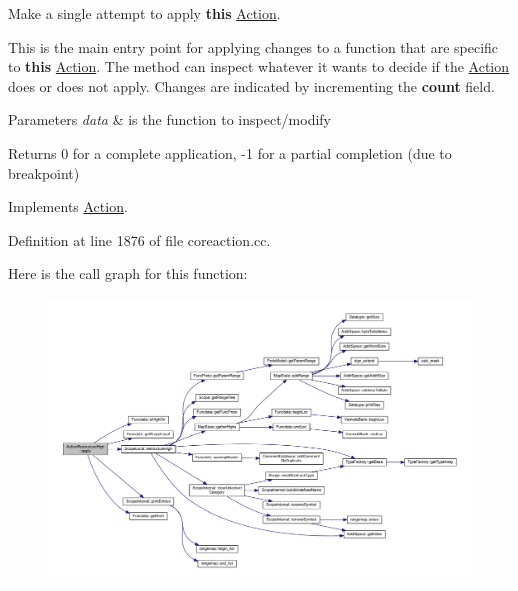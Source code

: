 Make a single attempt to apply {\bfseries{this}} \mbox{\hyperlink{class_action}{Action}}. 

This is the main entry point for applying changes to a function that are specific to {\bfseries{this}} \mbox{\hyperlink{class_action}{Action}}. The method can inspect whatever it wants to decide if the \mbox{\hyperlink{class_action}{Action}} does or does not apply. Changes are indicated by incrementing the {\bfseries{count}} field. 
\begin{DoxyParams}{Parameters}
{\em data} & is the function to inspect/modify \\
\hline
\end{DoxyParams}
\begin{DoxyReturn}{Returns}
0 for a complete application, -\/1 for a partial completion (due to breakpoint) 
\end{DoxyReturn}


Implements \mbox{\hyperlink{class_action_aac1c3999d6c685b15f5d9765a4d04173}{Action}}.



Definition at line 1876 of file coreaction.\+cc.

Here is the call graph for this function\+:
\nopagebreak
\begin{figure}[H]
\begin{center}
\leavevmode
\includegraphics[width=350pt]{class_action_restructure_high_aeeacf5bf4d99c638c486a23b69f19207_cgraph}
\end{center}
\end{figure}
\mbox{\label{class_action_restructure_high_a1180b8277ebd3c5ce38c86fe7a72c0db}} 
